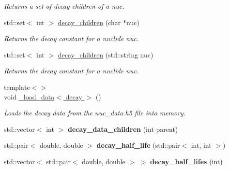 \begin{DoxyCompactItemize}
\begin{DoxyCompactList}\small\item\em Returns a set of decay children of a {\itshape nuc}. \end{DoxyCompactList}\item 
\mbox{\label{namespacepyne_aeb604c0bb8fdabe26de23893d7459945}} 
std\+::set$<$ int $>$ \hyperlink{namespacepyne_aeb604c0bb8fdabe26de23893d7459945}{decay\+\_\+children} (char $\ast$nuc)
\begin{DoxyCompactList}\small\item\em Returns the decay constant for a nuclide {\itshape nuc}. \end{DoxyCompactList}\item 
\mbox{\label{namespacepyne_ace6a474aae75deaa2dfc0df207f614f2}} 
std\+::set$<$ int $>$ \hyperlink{namespacepyne_ace6a474aae75deaa2dfc0df207f614f2}{decay\+\_\+children} (std\+::string nuc)
\begin{DoxyCompactList}\small\item\em Returns the decay constant for a nuclide {\itshape nuc}. \end{DoxyCompactList}\item 
\mbox{\label{namespacepyne_a07e79f58de58caf7c09cd643dcd2155a}} 
{\footnotesize template$<$$>$ }\\void \hyperlink{namespacepyne_a07e79f58de58caf7c09cd643dcd2155a}{\+\_\+load\+\_\+data$<$ decay $>$} ()
\begin{DoxyCompactList}\small\item\em Loads the decay data from the nuc\+\_\+data.\+h5 file into memory. \end{DoxyCompactList}\item 
\mbox{\label{namespacepyne_a4d9d984e721b6e222b2472e8c4dc3876}} 
std\+::vector$<$ int $>$ {\bfseries decay\+\_\+data\+\_\+children} (int parent)
\item 
\mbox{\label{namespacepyne_acfa39b50f6a8d82e8a651df1f2802c91}} 
std\+::pair$<$ double, double $>$ {\bfseries decay\+\_\+half\+\_\+life} (std\+::pair$<$ int, int $>$)
\item 
\mbox{\label{namespacepyne_a107db9126709d0f3ccf56f198d4270a5}} 
std\+::vector$<$ std\+::pair$<$ double, double $>$ $>$ {\bfseries decay\+\_\+half\+\_\+lifes} (int)

\end{DoxyCompactItemize}
